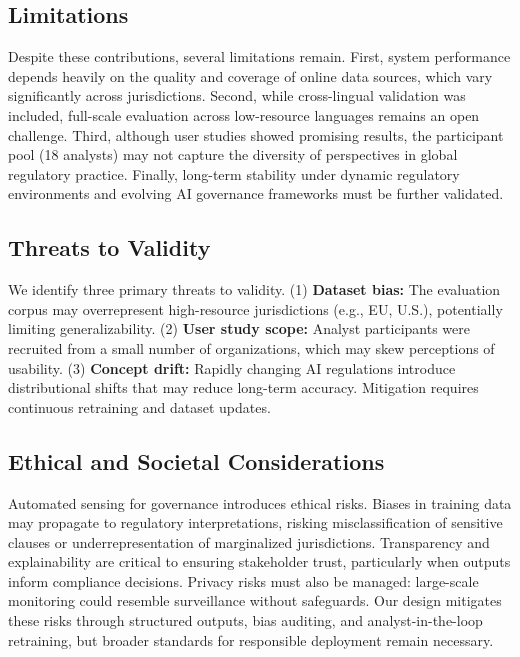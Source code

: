 {\subsection{Limitations}
Despite these contributions, several limitations remain. 
First, system performance depends heavily on the quality and coverage of online data sources, which vary significantly across jurisdictions. 
Second, while cross-lingual validation was included, full-scale evaluation across low-resource languages remains an open challenge. 
Third, although user studies showed promising results, the participant pool (18 analysts) may not capture the diversity of perspectives in global regulatory practice. 
Finally, long-term stability under dynamic regulatory environments and evolving AI governance frameworks must be further validated.

\subsection{Threats to Validity}
We identify three primary threats to validity. 
(1) \textbf{Dataset bias:} The evaluation corpus may overrepresent high-resource jurisdictions (e.g., EU, U.S.), potentially limiting generalizability. 
(2) \textbf{User study scope:} Analyst participants were recruited from a small number of organizations, which may skew perceptions of usability. 
(3) \textbf{Concept drift:} Rapidly changing AI regulations introduce distributional shifts that may reduce long-term accuracy. 
Mitigation requires continuous retraining and dataset updates. 

\subsection{Ethical and Societal Considerations}
Automated sensing for governance introduces ethical risks. 
Biases in training data may propagate to regulatory interpretations, risking misclassification of sensitive clauses or underrepresentation of marginalized jurisdictions. 
Transparency and explainability are critical to ensuring stakeholder trust, particularly when outputs inform compliance decisions. 
Privacy risks must also be managed: large-scale monitoring could resemble surveillance without safeguards. 
Our design mitigates these risks through structured outputs, bias auditing, and analyst-in-the-loop retraining, but broader standards for responsible deployment remain necessary. 

}
